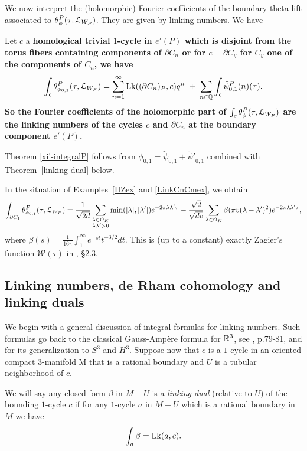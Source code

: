 We now interpret the (holomorphic) Fourier coefficients of the
boundary theta lift associated to $ \theta^P_{\phi}(\tau,\mathcal{L}_{W_P})$.
They are given by linking numbers. We have


\begin{theorem}\label{xi'-integralP}
Let $c$ a \bf{homological trivial} $1$-cycle in $e'(P)$ which
is disjoint from the torus fibers containing components of $\partial
C_n$ or for $c=\partial C_y$ for $C_y$ one of the components of
$C_n$, we have
\[
\int_{c} \theta^P_{\phi_{0,1}}(\tau,\mathcal{L}_{W_P}) = 
  \sum_{n=1}^{\infty}  \operatorname{Lk}((\partial C_n)_P,c) q^n
 \; + \; \sum_{n \in \mathbb{Q}} \int_{c}  {\tilde{\psi}_{0,1}^P}(n)(\tau).
\]
 So the Fourier coefficients of the holomorphic part of $\int_{c} \theta^P_{\phi}(\tau,\mathcal{L}_{W_P})$ are the linking numbers of the cycles $c$ and $ \partial C_n$ at the boundary component $e'(P)$.  
 \end{theorem}

Theorem \ref{xi'-integralP} follows from $\phi_{0,1} = \tilde{\psi}_{0,1} + \tilde{\psi'}_{0,1}$ combined with Theorem~\ref{linking-dual} below.  

\begin{example}\label{HZbeta}
In the situation of Examples~\ref{HZex} and \ref{LinkCnCmex}, we obtain
\[
\int_{\partial C_1} \theta^P_{\phi_{0,1}}(\tau,\mathcal{L}_{W_P}) = \frac{1}{\sqrt{2d}} \sum_{\substack{\lambda \in \mathcal{O}_K \\ \lambda\lambda'>0}} \min(|\lambda|,|\lambda'|) e^{-2\pi \lambda \lambda' \tau } - \frac{\sqrt{2}}{\sqrt{dv}} \sum_{\lambda \in \mathcal{O}_K} \beta (\pi v (\lambda-\lambda')^2) e^{-2\pi \lambda \lambda' \tau},
\]
where $\beta(s) = \tfrac1{16\pi} \int_1^{\infty} e^{-st}t^{-3/2} dt$. This is (up to a constant) exactly Zagier's function $\mathcal{W}(\tau)$ in \cite{HZ}, \S 2.3. 


\end{example}

\subsection{Linking numbers, de Rham cohomology and linking duals} \label{generallinking}
We begin with a general discussion of integral formulas for linking numbers.
Such formulas go back to the classical Gauss-Amp\`ere formula for
$\mathbb{R}^3$, see \cite{F}, p.79-81, and \cite{DG} for its generalization
to $S^3$ and $H^3$.
Suppose now that $c$ is a $1$-cycle in an oriented compact $3$-manifold
M that is a rational boundary and $U$ is a tubular neighborhood of
$c$.
\begin{definition}
We will say any closed form $\beta$ in $M-U$ is a {\it linking dual}
(relative to $U$) of the bounding $1$-cycle $c$ if for any $1$-cycle
$a$ in $M-U$
which is a rational boundary in $M$ we have
\begin{equation*} \label{linkingdualdef} 
\int_a \beta = \operatorname{Lk}(a,c).
\end{equation*}
\end{definition}

